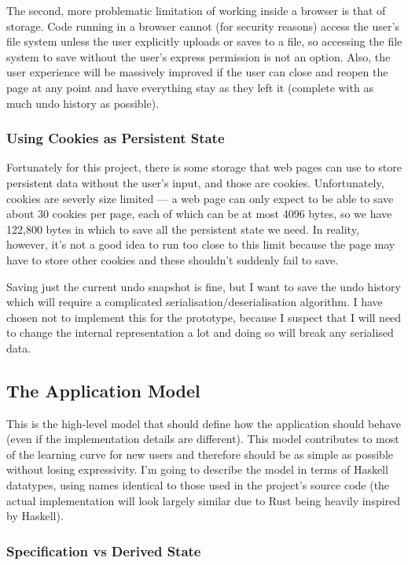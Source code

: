 \documentclass[12pt]{article}
\begin{document}
The second, more problematic limitation of working inside a browser is that of storage.  Code
running in a browser cannot (for security reasons) access the user's file system unless the user
explicitly uploads or saves to a file, so accessing the file system to save without the user's
express permission is not an option.  Also, the user experience will be massively improved if the
user can close and reopen the page at any point and have everything stay as they left it (complete
with as much undo history as possible).

\subsubsection{Using Cookies as Persistent State}

Fortunately for this project, there is some storage that web pages can use to store persistent data
without the user's input, and those are cookies.  Unfortunately, cookies are severly size limited
--- a web page can only expect to be able to save about 30 cookies per page, each of which can be at
most 4096 bytes, so we have 122,800 bytes in which to save all the persistent state we need.  In
reality, however, it's not a good idea to run too close to this limit because the page may have to
store other cookies and these shouldn't suddenly fail to save.

Saving just the current undo snapshot is fine, but I want to save the undo history which will
require a complicated serialisation/deserialisation algorithm.  I have chosen not to implement this
for the prototype, because I suspect that I will need to change the internal representation a lot
and doing so will break any serialised data.

\subsection{The Application Model}

This is the high-level model that should define how the application should behave (even if the
implementation details are different).  This model contributes to most of the learning curve for new
users and therefore should be as simple as possible without losing expressivity.  I'm going to
describe the model in terms of Haskell datatypes, using names identical to those used in the
project's source code (the actual implementation will look largely similar due to Rust being heavily
inspired by Haskell).

\subsubsection{Specification vs Derived State}
\end{document}
